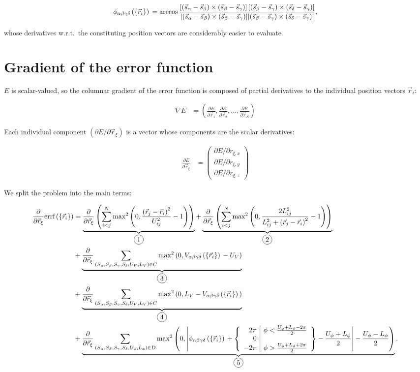 \documentclass[a4paper]{article}
\newcommand*\circled[1]{
  \tikz[baseline=(char.base)]{
    \node[shape=circle,draw,inner sep=2pt] (char) {#1};
  }
}
\begin{document}
\begin{align}\begin{aligned}
  \phi_{\alpha\beta\gamma\delta}\left(\left\{\vec{r}_i \right\}\right){} = \arccos
    \frac{\left[
      \left(\vec{s}_{\alpha}-\vec{s}_{\beta}\right) \times \left(\vec{s}_{\beta}-\vec{s}_{\gamma}\right)
    \right]\left[
      \left(\vec{s}_{\beta}-\vec{s}_{\gamma}\right) \times \left(\vec{s}_{\delta}-\vec{s}_{\gamma}\right)
    \right]}{\lvert
      \left(\vec{s}_{\alpha}-\vec{s}_{\beta}\right) \times \left(\vec{s}_{\beta}-\vec{s}_{\gamma}\right)
    \rvert\lvert
      \left(\vec{s}_{\beta}-\vec{s}_{\gamma}\right) \times \left(\vec{s}_{\delta}-\vec{s}_{\gamma}\right)
    \rvert
    },
\end{aligned}\end{align}

whose derivatives w.r.t.\ the constituting position vectors are considerably
easier to evaluate.

\newpage

\section{Gradient of the error function}

$E$ is scalar-valued, so the columnar gradient of the error function is
composed of partial derivatives to the individual position vectors $\vec{r}_i$:

\begin{align*}
  \nabla E &= \left(
    \frac{\partial E}{\partial \vec{r}_1},
    \frac{\partial E}{\partial \vec{r}_2},
    \ldots,
    \frac{\partial E}{\partial \vec{r}_N}
  \right)
\end{align*}

Each individual component $\left( \partial E / \partial \vec{r}_\xi \right)$
is a vector whose components are the scalar derivatives:

\begin{align*}
  \frac{\partial E}{\partial \vec{r}_\xi} &= \begin{pmatrix}
    \partial E / \partial r_{\xi , x} \\
    \partial E / \partial r_{\xi , y} \\
    \partial E / \partial r_{\xi , z} 
  \end{pmatrix}
\end{align*}

We split the problem into the main terms:

\begin{align*}
  \partialPosVec{\xi} \errf 
  &= \underbrace{\partialPosVec{\xi} \left(
      \ijNSum \distanceErrorFirstTerm{2}
    \right)
  }_{\circled{1}}
  + \underbrace{\partialPosVec{\xi} \left(
      \ijNSum \distanceErrorSecondTerm{2}
    \right)
  }_{\circled{2}}\\
  &+ \underbrace{\partialPosVec{\xi} \chiralSum \chiralErrorFirstTerm{2}
  }_{\circled{3}}\\
  &+ \underbrace{\partialPosVec{\xi} \chiralSum \chiralErrorSecondTerm{2}
  }_{\circled{4}}\\
  &+ \underbrace{\partialPosVec{\xi} \dihedralSum \dihedralTerm{2}
  }_{\circled{5}}.
\end{align*}
\end{document}
